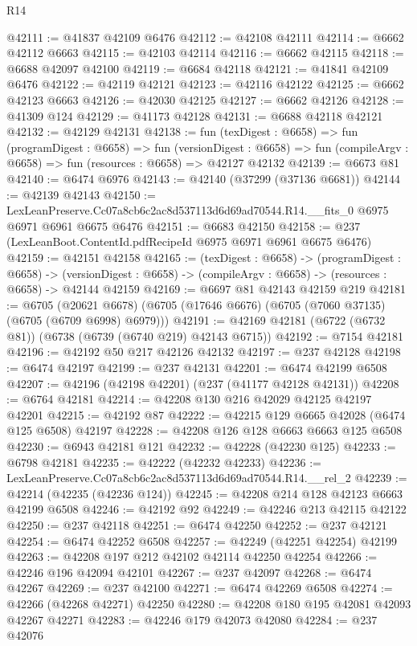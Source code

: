 \begin{lexlean}{R14}
\begin{coremodule}
@42111 := @41837 @42109 @6476
@42112 := @42108 @42111
@42114 := @6662 @42112 @6663
@42115 := @42103 @42114
@42116 := @6662 @42115
@42118 := @6688 @42097 @42100
@42119 := @6684 @42118
@42121 := @41841 @42109 @6476
@42122 := @42119 @42121
@42123 := @42116 @42122
@42125 := @6662 @42123 @6663
@42126 := @42030 @42125
@42127 := @6662 @42126
@42128 := @41309 @124
@42129 := @41173 @42128
@42131 := @6688 @42118 @42121
@42132 := @42129 @42131
@42138 := fun (texDigest : @6658) =>
  fun (programDigest : @6658) =>
  fun (versionDigest : @6658) =>
  fun (compileArgv : @6658) => fun (resources : @6658) => @42127 @42132
@42139 := @6673 @81
@42140 := @6474 @6976
@42143 := @42140 (@37299 (@37136 @6681))
@42144 := @42139 @42143
@42150 := LexLeanPreserve.Cc07a8cb6c2ac8d537113d6d69ad70544.R14.__fits_0
    @6975
    @6971
    @6961
    @6675
    @6476
@42151 := @6683 @42150
@42158 := @237 (LexLeanBoot.ContentId.pdfRecipeId @6975 @6971 @6961 @6675 @6476)
@42159 := @42151 @42158
@42165 := (texDigest : @6658) ->
  (programDigest : @6658) ->
  (versionDigest : @6658) -> (compileArgv : @6658) -> (resources : @6658) -> @42144 @42159
@42169 := @6697 @81 @42143 @42159 @219
@42181 := @6705
    (@20621 @6678)
    (@6705 (@17646 @6676) (@6705 (@7060 @37135) (@6705 (@6709 @6998) @6979)))
@42191 := @42169 @42181 (@6722 (@6732 @81)) (@6738 (@6739 (@6740 @219) @42143 @6715))
@42192 := @7154 @42181
@42196 := @42192 @50 @217 @42126 @42132
@42197 := @237 @42128
@42198 := @6474 @42197
@42199 := @237 @42131
@42201 := @6474 @42199 @6508
@42207 := @42196 (@42198 @42201) (@237 (@41177 @42128 @42131))
@42208 := @6764 @42181
@42214 := @42208 @130 @216 @42029 @42125 @42197 @42201
@42215 := @42192 @87
@42222 := @42215 @129 @6665 @42028 (@6474 @125 @6508) @42197
@42228 := @42208 @126 @128 @6663 @6663 @125 @6508
@42230 := @6943 @42181 @121
@42232 := @42228 (@42230 @125)
@42233 := @6798 @42181
@42235 := @42222 (@42232 @42233)
@42236 := LexLeanPreserve.Cc07a8cb6c2ac8d537113d6d69ad70544.R14.__rel_2
@42239 := @42214 (@42235 (@42236 @124))
@42245 := @42208 @214 @128 @42123 @6663 @42199 @6508
@42246 := @42192 @92
@42249 := @42246 @213 @42115 @42122
@42250 := @237 @42118
@42251 := @6474 @42250
@42252 := @237 @42121
@42254 := @6474 @42252 @6508
@42257 := @42249 (@42251 @42254) @42199
@42263 := @42208 @197 @212 @42102 @42114 @42250 @42254
@42266 := @42246 @196 @42094 @42101
@42267 := @237 @42097
@42268 := @6474 @42267
@42269 := @237 @42100
@42271 := @6474 @42269 @6508
@42274 := @42266 (@42268 @42271) @42250
@42280 := @42208 @180 @195 @42081 @42093 @42267 @42271
@42283 := @42246 @179 @42073 @42080
@42284 := @237 @42076

\end{coremodule}
\end{lexlean}
